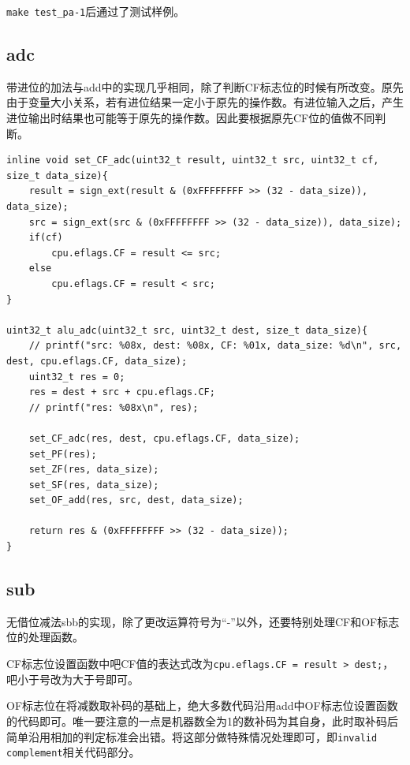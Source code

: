\documentclass[UTF8]{ctexart}
\begin{document}
\verb|make test_pa-1|后通过了测试样例。

\subsection{adc}
带进位的加法与add中的实现几乎相同，除了判断CF标志位的时候有所改变。原先由于变量大小关系，若有进位结果一定小于原先的操作数。有进位输入之后，产生进位输出时结果也可能等于原先的操作数。因此要根据原先CF位的值做不同判断。

\begin{lstlisting}[style=CStyle]
inline void set_CF_adc(uint32_t result, uint32_t src, uint32_t cf, size_t data_size){
    result = sign_ext(result & (0xFFFFFFFF >> (32 - data_size)), data_size);
    src = sign_ext(src & (0xFFFFFFFF >> (32 - data_size)), data_size);
    if(cf)
        cpu.eflags.CF = result <= src;
    else
        cpu.eflags.CF = result < src;
}

uint32_t alu_adc(uint32_t src, uint32_t dest, size_t data_size){
    // printf("src: %08x, dest: %08x, CF: %01x, data_size: %d\n", src, dest, cpu.eflags.CF, data_size);
    uint32_t res = 0;
    res = dest + src + cpu.eflags.CF;
    // printf("res: %08x\n", res);
    
    set_CF_adc(res, dest, cpu.eflags.CF, data_size);
    set_PF(res);
    set_ZF(res, data_size);
    set_SF(res, data_size);
    set_OF_add(res, src, dest, data_size);
    
    return res & (0xFFFFFFFF >> (32 - data_size));
}
\end{lstlisting}

\subsection{sub}

无借位减法sbb的实现，除了更改运算符号为“-”以外，还要特别处理CF和OF标志位的处理函数。
\par CF标志位设置函数中吧CF值的表达式改为\verb|cpu.eflags.CF = result > dest;|，吧小于号改为大于号即可。
\par OF标志位在将减数取补码的基础上，绝大多数代码沿用add中OF标志位设置函数的代码即可。唯一要注意的一点是机器数全为1的数补码为其自身，此时取补码后简单沿用相加的判定标准会出错。将这部分做特殊情况处理即可，即\verb|invalid complement|相关代码部分。
\end{document}
